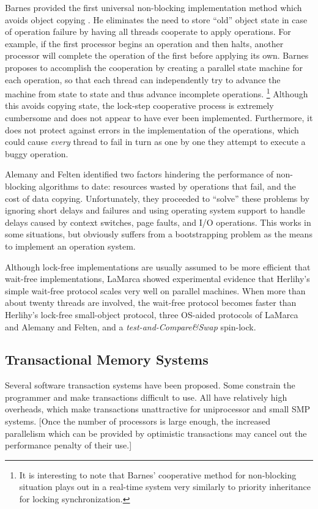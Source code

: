 \documentclass[12pt]{article}
\newcommand{\subsecput}[2]{\subsection{#2}\label{sec:#1}}
\begin{document}
Barnes provided the first universal non-blocking implementation
method which avoids object copying \cite{Barnes93}.  He eliminates the
need to store ``old'' object
state in case of operation failure by having all threads cooperate to
apply operations.  For example, if the first processor begins an operation
and then halts, another processor will complete the operation of the first
before applying its own.  Barnes proposes to accomplish the
cooperation by creating a parallel state machine for each operation,
so that each thread can independently try to advance the machine from state
to state and thus advance incomplete operations.%
\footnote{It is interesting to note that Barnes' cooperative method
  for non-blocking 
  situation plays out in a real-time system very similarly to priority
  inheritance for locking synchronization.}
Although this avoids
copying state, the lock-step cooperative process is extremely
cumbersome and does not appear to have ever been implemented.
Furthermore, it does not protect against errors in the implementation
of the operations, which could cause \emph{every} thread to fail in turn
as one by one they attempt to execute a buggy operation.

Alemany and Felten \cite{AlemanyFe92} identified two factors hindering the
performance of non-blocking algorithms to date: resources wasted by operations
that fail, and the cost of data copying.  Unfortunately, they
proceeded to
``solve'' these problems by ignoring short delays and failures and
using operating system support to handle delays caused by
context switches, page faults, and
I/O operations.  This works in some situations, but obviously suffers
from a bootstrapping problem as the means to implement an operation system.

Although lock-free implementations are usually assumed to be more
efficient that wait-free implementations, LaMarca \cite{LaMarca94}
showed experimental evidence that Herlihy's simple
wait-free protocol scales very well on parallel machines.
When more than about twenty threads are involved, the wait-free
protocol becomes
faster than Herlihy's lock-free small-object protocol, three OS-aided
protocols of LaMarca and Alemany and Felten, and a
\emph{test-and-Compare\&Swap} spin-lock.


\subsecput{tm}{Transactional Memory Systems}

Several software transaction systems have been proposed.  Some constrain the
programmer and make transactions difficult to use.  All have
relatively high overheads, which make transactions unattractive for
uniprocessor and small SMP systems. [Once the number of processors is
large enough, the increased parallelism which can be provided by
optimistic transactions may cancel out the performance penalty of
their use.]
\end{document}
